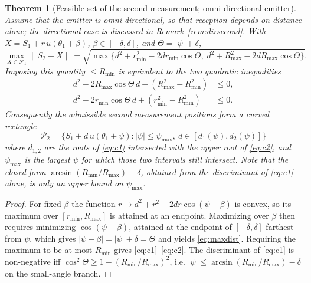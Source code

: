 \documentclass[preprint,12pt,3p]{elsarticle}
\newtheorem{theorem}{Theorem}
\theoremstyle{definition}
\newcommand{\Rmin}{R_{\min}}
\newcommand{\Rmax}{R_{\max}}
\newcommand{\bP}{\mathcal{P}}
\newcommand{\bF}{\mathcal{F}}
\begin{document}
\begin{theorem}[Feasible set of the second measurement; omni-directional emitter]
\label{thm:second}
Assume that the emitter is omni-directional, so that reception depends on distance alone; the
directional case is discussed in Remark~\ref{rem:dirsecond}.
With $X=S_1+r\,u(\theta_1+\beta)$, $\beta\in[-\delta,\delta]$, and $\Theta=|\psi|+\delta$,
\begin{equation}
\max_{X\in\bF_1}\|S_2-X\|=\sqrt{\max\{d^2+r_{\min}^2-2dr_{\min}\cos\Theta,\;
d^2+\Rmax^2-2d\Rmax\cos\Theta\}}.
\label{eq:maxdist}
\end{equation}
Imposing this quantity $\le \Rmin$ is equivalent to the two quadratic inequalities
\begin{align}
d^2-2\Rmax\cos\Theta\,d+(\Rmax^2-\Rmin^2)&\le0,\label{eq:c1}\\
d^2-2r_{\min}\cos\Theta\,d+(r_{\min}^2-\Rmin^2)&\le0.\label{eq:c2}
\end{align}
Consequently the admissible second measurement positions form a curved rectangle
\begin{equation}
\bP_2=\{S_1+d\,u(\theta_1+\psi):|\psi|\le\psi_{\max},\ d\in[d_1(\psi),d_2(\psi)]\}
\end{equation}
where $d_{1,2}$ are the roots of \eqref{eq:c1} intersected with the upper root of \eqref{eq:c2},
and $\psi_{\max}$ is the largest $\psi$ for which those two intervals still intersect. Note that
the closed form $\arcsin(\Rmin/\Rmax)-\delta$, obtained from the discriminant of \eqref{eq:c1}
alone, is only an \emph{upper bound} on $\psi_{\max}$.
\end{theorem}
\begin{proof}
For fixed $\beta$ the function $r\mapsto d^2+r^2-2dr\cos(\psi-\beta)$ is convex, so its maximum
over $[r_{\min},\Rmax]$ is attained at an endpoint. Maximizing over $\beta$ then requires
minimizing $\cos(\psi-\beta)$, attained at the endpoint of $[-\delta,\delta]$ farthest from
$\psi$, which gives $|\psi-\beta|=|\psi|+\delta=\Theta$ and yields \eqref{eq:maxdist}. Requiring
the maximum to be at most $\Rmin$ gives \eqref{eq:c1}--\eqref{eq:c2}. The discriminant of
\eqref{eq:c1} is non-negative iff $\cos^2\Theta\ge1-(\Rmin/\Rmax)^2$, i.e.
$|\psi|\le\arcsin(\Rmin/\Rmax)-\delta$ on the small-angle branch.
\end{proof}
\end{document}
